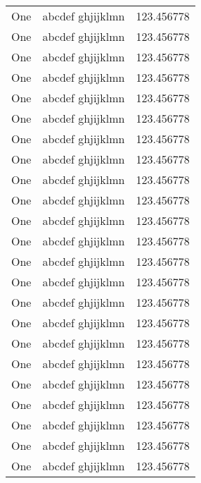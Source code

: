 \documentclass[12pt]{ctexart}
\begin{document}
\begin{center}
\begin{longtable}{|l|l|l|}
    One & abcdef ghjijklmn & 123.456778 \\
    One & abcdef ghjijklmn & 123.456778 \\
    One & abcdef ghjijklmn & 123.456778 \\
    One & abcdef ghjijklmn & 123.456778 \\
    One & abcdef ghjijklmn & 123.456778 \\
    One & abcdef ghjijklmn & 123.456778 \\
    One & abcdef ghjijklmn & 123.456778 \\
    One & abcdef ghjijklmn & 123.456778 \\
    One & abcdef ghjijklmn & 123.456778 \\
    One & abcdef ghjijklmn & 123.456778 \\
    One & abcdef ghjijklmn & 123.456778 \\
    One & abcdef ghjijklmn & 123.456778 \\
    One & abcdef ghjijklmn & 123.456778 \\
    One & abcdef ghjijklmn & 123.456778 \\
    One & abcdef ghjijklmn & 123.456778 \\
    One & abcdef ghjijklmn & 123.456778 \\
    One & abcdef ghjijklmn & 123.456778 \\
    One & abcdef ghjijklmn & 123.456778 \\
    One & abcdef ghjijklmn & 123.456778 \\
    One & abcdef ghjijklmn & 123.456778 \\
    One & abcdef ghjijklmn & 123.456778 \\
    One & abcdef ghjijklmn & 123.456778 \\
    One & abcdef ghjijklmn & 123.456778 \\
    \end{longtable}
    \end{center}
\newpage 
\end{document}
